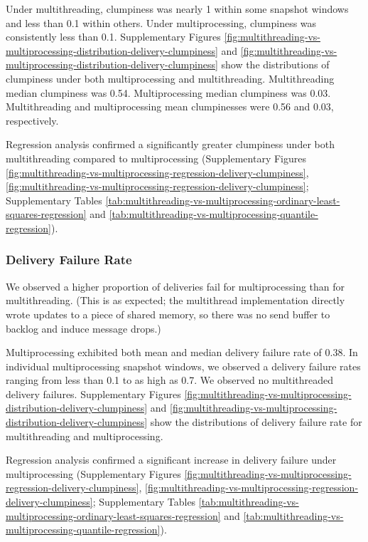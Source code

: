 Under multithreading, clumpiness was nearly 1 within some snapshot windows and less than 0.1 within others.
Under multiprocessing, clumpiness was consistently less than 0.1.
Supplementary Figures \ref{fig:multithreading-vs-multiprocessing-distribution-delivery-clumpiness} and \ref{fig:multithreading-vs-multiprocessing-distribution-delivery-clumpiness} show the distributions of clumpiness under both multiprocessing and multithreading.
Multithreading median clumpiness was 0.54.
Multiprocessing median clumpiness was 0.03.
Multithreading and multiprocessing mean clumpinesses were 0.56 and 0.03, respectively.

Regression analysis confirmed a significantly greater clumpiness under both multithreading compared to multiprocessing (Supplementary Figures \ref{fig:multithreading-vs-multiprocessing-regression-delivery-clumpiness}, \ref{fig:multithreading-vs-multiprocessing-regression-delivery-clumpiness}; Supplementary Tables \ref{tab:multithreading-vs-multiprocessing-ordinary-least-squares-regression} and \ref{tab:multithreading-vs-multiprocessing-quantile-regression}).

\subsubsection{Delivery Failure Rate}

We observed a higher proportion of deliveries fail for multiprocessing than for multithreading.
(This is as expected; the multithread implementation directly wrote updates to a piece of shared memory, so there was no send buffer to backlog and induce message drops.)

Multiprocessing exhibited both mean and median delivery failure rate of 0.38.
In individual multiprocessing snapshot windows, we observed a delivery failure rates ranging from less than 0.1 to as high as 0.7.
We observed no multithreaded delivery failures.
Supplementary Figures \ref{fig:multithreading-vs-multiprocessing-distribution-delivery-clumpiness} and \ref{fig:multithreading-vs-multiprocessing-distribution-delivery-clumpiness} show the distributions of delivery failure rate for multithreading and multiprocessing.

Regression analysis confirmed a significant increase in delivery failure under multiprocessing (Supplementary Figures \ref{fig:multithreading-vs-multiprocessing-regression-delivery-clumpiness}, \ref{fig:multithreading-vs-multiprocessing-regression-delivery-clumpiness}; Supplementary Tables \ref{tab:multithreading-vs-multiprocessing-ordinary-least-squares-regression} and \ref{tab:multithreading-vs-multiprocessing-quantile-regression}).
